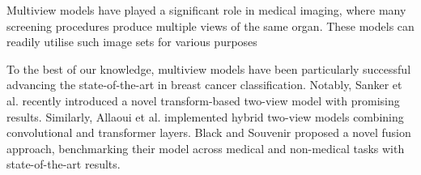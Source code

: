 Multiview models have played a significant role in medical imaging, where many screening procedures produce multiple views of the same organ. These models can readily utilise such image sets for various purposes \cite{swint_multiview, hybrid_mammo_net}

To the best of our knowledge, multiview models have been particularly successful advancing the state-of-the-art in breast cancer classification. Notably, Sanker et al. \cite{swint_multiview} recently introduced a novel transform-based two-view model with promising results. Similarly, Allaoui et al. \cite{hybrid_mammo_net} implemented hybrid two-view models combining convolutional and transformer layers.  Black and Souvenir \cite{multiview_hybrid_fusion_mutual_distill} proposed a novel fusion approach, benchmarking their model across medical and non-medical tasks with state-of-the-art results.